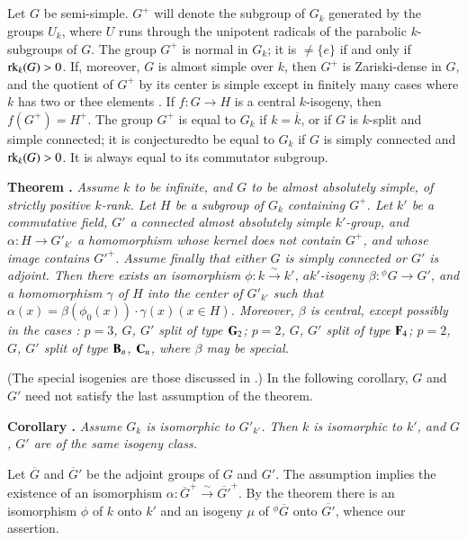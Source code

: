 \subsection{}\label{art05-sec1.1}
Let $G$ be semi-simple. $G^{+}$ will denote the subgroup of $G_{k}$ generated by the groups $U_{k}$, where $U$ runs through the unipotent radicals of the parabolic $k$-subgroups of $G$. The group $G^{+}$ is normal in $G_{k}$; it is $\neq \{e\}$ if and only if $\operatorname{\mathrm{rk}}_{k}(G)>0$. If, moreover, $G$ is almost simple over $k$, then $G^{+}$ is Zariski-dense in $G$, and the quotient of $G^{+}$ by its center is simple except in finitely many cases where $k$ has two or thee elements \cite{art05-key10}. If $f:G\to H$ is a central $k$-isogeny, then $f(G^{+})=H^{+}$. The group $G^{+}$ is equal to $G_{k}$ if $k=\overline{k}$, or if $G$ is $k$-split and simple connected; it is conjectured\pageoriginale to be equal to $G_{k}$ if $G$ is simply connected and $\operatorname{\mathrm{rk}}_{k}(G)>0$\cite{art05-key10}. It is always equal to its commutator subgroup.

\medskip
\noindent
{\bf Theorem .\label{art05-thm1.2}\label{ART05-THM1.2}}
{\em Assume $k$ to be infinite, and $G$ to be almost absolutely simple, of strictly positive $k$-rank. Let $H$ be a subgroup of $G_{k}$ containing $G^{+}$. Let $k'$ be a commutative field, $G'$ a connected almost absolutely simple $k'$-group, and $\alpha:H\to G'_{k'}$ a homomorphism whose kernel does not contain $G^{+}$, and whose image contains ${G'}^{+}$. Assume finally that either $G$ is simply connected or $G'$ is adjoint. Then there exists an isomorphism $\phi:k\xrightarrow{\sim}k'$, $ak'$-isogeny $\beta:{}^{\phi}G\to G'$, and a homomorphism $\gamma$ of $H$ into the center of $G'_{k'}$ such that $\alpha(x)=\beta(\phi_{0}(x))\cdot \gamma(x)(x\in H)$. Moreover, $\beta$ is central, except possibly in the cases : $p=3$, $G$, $G'$ split of type $\mathbf{G}_{2}$; $p=2$, $G$, $G'$ split of type $\mathbf{F}_{4}$; $p=2$, $G$, $G'$ split of type $\mathbf{B}_{n}$, $\mathbf{C}_{n}$, where $\beta$ may be special.}
\smallskip

(The special isogenies are those discussed in \cite[Exp. 21-24]{art05-key3}.) In the following corollary, $G$ and $G'$ need not satisfy the last assumption of the theorem.

\medskip
\noindent
{\bf Corollary .\label{art05-coro1.3}}
{\em Assume $G_{k}$ is isomorphic to $G'_{k'}$. Then $k$ is isomorphic to $k'$, and $G$, $G'$ are of the same isogeny class.}
\smallskip

Let $\overline{G}$ and $\overline{G}'$ be the adjoint groups of $G$ and $G'$. The assumption implies the existence of an isomorphism $\alpha:\overline{G}^{+}\xrightarrow{\sim}\overline{G'}^{+}$. By the theorem there is an isomorphism $\phi$ of $k$ onto $k'$ and an isogeny $\mu$ of ${}^{\phi}\overline{G}$ onto $\overline{G'}$, whence our assertion.

